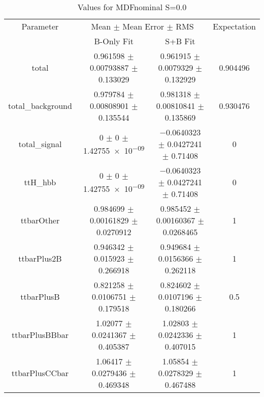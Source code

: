 \begin{table}
\centering
\caption{Values for MDFnominal S=0.0}
\begin{tabular}{cccc}
\toprule
Parameter & \multicolumn{2}{c}{Mean $\pm$ Mean Error $\pm$ RMS} & Expectation\\
 & B-Only Fit & S+B Fit & \\
\midrule
total & \num{0.961598} $\pm$ \num{0.00793887} $\pm$ \num{0.133029} & \num{0.961915} $\pm$ \num{0.0079329} $\pm$ \num{0.132929} & \num{0.904496}\\
total\_background & \num{0.979784} $\pm$ \num{0.00808901} $\pm$ \num{0.135544} & \num{0.981318} $\pm$ \num{0.00810841} $\pm$ \num{0.135869} & \num{0.930476}\\
total\_signal & \num{0} $\pm$ \num{0} $\pm$ \num{1.42755e-09} & \num{-0.0640323} $\pm$ \num{0.0427241} $\pm$ \num{0.71408} & \num{0}\\
ttH\_hbb & \num{0} $\pm$ \num{0} $\pm$ \num{1.42755e-09} & \num{-0.0640323} $\pm$ \num{0.0427241} $\pm$ \num{0.71408} & \num{0}\\
ttbarOther & \num{0.984699} $\pm$ \num{0.00161829} $\pm$ \num{0.0270912} & \num{0.985452} $\pm$ \num{0.00160367} $\pm$ \num{0.0268465} & \num{1}\\
ttbarPlus2B & \num{0.946342} $\pm$ \num{0.015923} $\pm$ \num{0.266918} & \num{0.949684} $\pm$ \num{0.0156366} $\pm$ \num{0.262118} & \num{1}\\
ttbarPlusB & \num{0.821258} $\pm$ \num{0.0106751} $\pm$ \num{0.179518} & \num{0.824602} $\pm$ \num{0.0107196} $\pm$ \num{0.180266} & \num{0.5}\\
ttbarPlusBBbar & \num{1.02077} $\pm$ \num{0.0241367} $\pm$ \num{0.405387} & \num{1.02803} $\pm$ \num{0.0242336} $\pm$ \num{0.407015} & \num{1}\\
ttbarPlusCCbar & \num{1.06417} $\pm$ \num{0.0279436} $\pm$ \num{0.469348} & \num{1.05854} $\pm$ \num{0.0278329} $\pm$ \num{0.467488} & \num{1}\\
\bottomrule
\end{tabular}
\end{table}